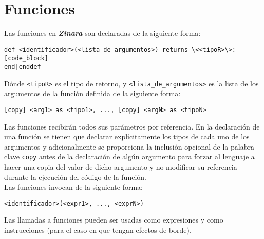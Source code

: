 \documentclass[12pt, spanish]{report}
\begin{document}
\chapter{Funciones}
\label{sec:func}

Las funciones en \emph{\textbf{Zinara}} son declaradas de la siguiente
forma:

\begin{verbatim}
def <identificador>(<lista_de_argumentos>) returns \<<tipoR>\>:
[code_block]
end|enddef
\end{verbatim}

D\'onde \texttt{<tipoR>} es el tipo de retorno, y
\texttt{<lista\_de\_argumentos>} es la lista de los argumentos de la
funci\'on definida de la siguiente forma:

\begin{verbatim}
[copy] <arg1> as <tipo1>, ..., [copy] <argN> as <tipoN>
\end{verbatim}

Las funciones recibir\'an todos sus par\'ametros por referencia. En la
declaraci\'on de una funci\'on se tienen que declarar expl\'icitamente los
tipos de cada uno de los argumentos y adicionalmente se proporciona la
inclusi\'on opcional de la palabra clave \texttt{copy} antes de la
declaraci\'on de alg\'un argumento para forzar al lenguaje a hacer una
copia del valor de dicho argumento y no modificar su referencia
durante la ejecuci\'on del c\'odigo de la funci\'on.\\

Las funciones invocan de la siguiente forma:

\begin{verbatim}
<identificador>(<expr1>, ..., <exprN>)
\end{verbatim}

Las llamadas a funciones pueden ser usadas como expresiones y como
instrucciones (para el caso en que tengan efectos de borde).
\end{document}
